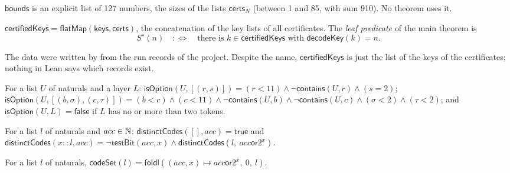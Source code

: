 \begin{definition}\label{cb:def:bounds}
$\mathsf{bounds}$ is an explicit list of 127 numbers, the sizes of the lists $\mathsf{certs}_N$ (between 1 and 85, with
sum 910). No theorem uses it.
\end{definition}

\begin{definition}\label{cb:def:certifiedkeys}
$\mathsf{certifiedKeys}=\mathsf{flatMap}(\mathsf{keys},\mathsf{certs})$, the concatenation of the key lists of all
certificates. The \emph{leaf predicate} of the main theorem is
\[
S^\star(n)\quad:\Longleftrightarrow\quad\text{there is }k\in\mathsf{certifiedKeys}\text{ with }\mathsf{decodeKey}(k)=n.
\]
\end{definition}

The data were written by  from the run records of the project. Despite the name,
$\mathsf{certifiedKeys}$ is just the list of the keys of the certificates; nothing in Lean says which records exist.

\begin{definition}\label{cb:def:isoption}
For a list $U$ of naturals and a layer $L$:
$\mathsf{isOption}(U,[(r,s)])=(r<11)\wedge\neg\mathsf{contains}(U,r)\wedge(s=2)$;
$\mathsf{isOption}(U,[(b,\sigma),(c,\tau)])=(b<c)\wedge(c<11)\wedge\neg\mathsf{contains}(U,b)\wedge
\neg\mathsf{contains}(U,c)\wedge(\sigma<2)\wedge(\tau<2)$; and $\mathsf{isOption}(U,L)=\mathsf{false}$ if $L$ has no
or more than two tokens.
\end{definition}

\begin{definition}\label{cb:def:distinctcodes}
For a list $l$ of naturals and $acc\in\mathbb N$: $\mathsf{distinctCodes}([],acc)=\mathsf{true}$ and
$\mathsf{distinctCodes}(x\mathbin{::}l,acc)=\neg\mathsf{testBit}(acc,x)\wedge\mathsf{distinctCodes}(l,\
acc\mathbin{\mathsf{or}}2^x)$.
\end{definition}

\begin{definition}\label{cb:def:codeset}
For a list $l$ of naturals, $\mathsf{codeSet}(l)=\mathsf{foldl}((acc,x)\mapsto acc\mathbin{\mathsf{or}}2^x,\ 0,\ l)$.
\end{definition}

